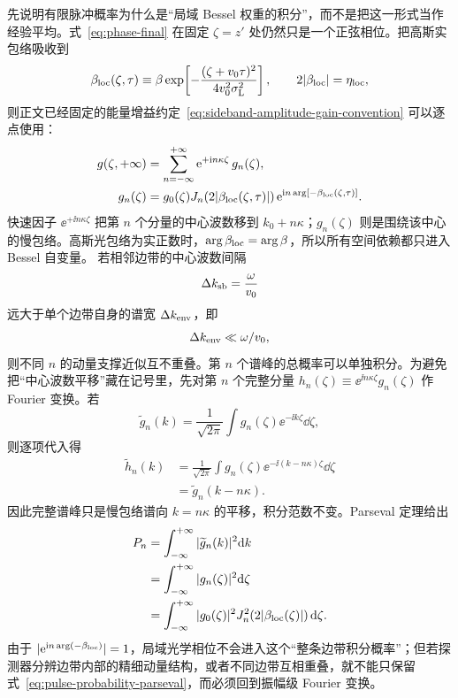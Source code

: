 先说明有限脉冲概率为什么是“局域 Bessel 权重的积分”，而不是把这一形式当作经验平均。式~\cref{eq:phase-final} 在固定 $\zeta=z'$ 处仍然只是一个正弦相位。把高斯实包络吸收到
\begin{equation}
\beta_{\rm loc}(\zeta,\tau)
\equiv
\beta\exp\!\left[-\frac{(\zeta+v_0\tau)^2}{4v_0^2\sigma_{\rm L}^2}\right],
\qquad
2|\beta_{\rm loc}|=\eta_{\rm loc},
\label{eq:beta-local-def}
\end{equation}
则正文已经固定的能量增益约定~\cref{eq:sideband-amplitude-gain-convention} 可以逐点使用：
\begin{align}
g(\zeta,+\infty)
&=\sum_{n=-\infty}^{+\infty}
\mathrm{e}^{+\mathrm{i} n\kappa\zeta}\,g_n(\zeta),
\label{eq:pulse-sideband-decomposition}\\
g_n(\zeta)
&=g_0(\zeta)
J_n\!\left(2|\beta_{\rm loc}(\zeta,\tau)|\right)
\mathrm{e}^{\mathrm{i} n\arg[-\beta_{\rm loc}(\zeta,\tau)]}.
\label{eq:pulse-local-sideband-amplitude}
\end{align}
快速因子 $\ee^{+\ii n\kappa\zeta}$ 把第 $n$ 个分量的中心波数移到
$k_0+n\kappa$；$g_n(\zeta)$ 则是围绕该中心的慢包络。高斯光包络为实正数时，$\arg\beta_{\rm loc}=\arg\beta$，所以所有空间依赖都只进入 Bessel 自变量。
若相邻边带的中心波数间隔
\begin{equation}
\Delta k_{\rm sb}=\frac{\omega}{v_0}
\end{equation}
远大于单个边带自身的谱宽 $\Delta k_{\rm env}$，即
\begin{equation}
{\Delta k_{\rm env}\ll \omega/v_0,}
\label{eq:sideband-orthogonality-general}
\end{equation}
则不同 $n$ 的动量支撑近似互不重叠。第 $n$ 个谱峰的总概率可以单独积分。为避免把“中心波数平移”藏在记号里，先对第 $n$ 个完整分量
$h_n(\zeta)\equiv\ee^{\ii n\kappa\zeta}g_n(\zeta)$ 作 Fourier 变换。若
\begin{equation}
\widetilde g_n(k)=\frac{1}{\sqrt{2\pi}}
\int g_n(\zeta)\ee^{-\ii k\zeta}\dd\zeta,
\end{equation}
则逐项代入得
\begin{align}
\widetilde h_n(k)
&=\frac{1}{\sqrt{2\pi}}
\int g_n(\zeta)\ee^{-\ii(k-n\kappa)\zeta}\dd\zeta\\
&=\widetilde g_n(k-n\kappa).
\label{eq:finite-pulse-fourier-shift}
\end{align}
因此完整谱峰只是慢包络谱向 $k=n\kappa$ 的平移，积分范数不变。Parseval 定理给出
\begin{align}
P_n
&=\int_{-\infty}^{+\infty}|\widetilde g_n(k)|^2\mathrm{d} k\\
&=\int_{-\infty}^{+\infty}|g_n(\zeta)|^2\mathrm{d}\zeta\\
&=\int_{-\infty}^{+\infty}|g_0(\zeta)|^2
J_n^2\!\left(2|\beta_{\rm loc}(\zeta)|\right)\mathrm{d}\zeta.
\label{eq:pulse-probability-parseval}
\end{align}
由于 $|\mathrm{e}^{\mathrm{i} n\arg(-\beta_{\rm loc})}|=1$，局域光学相位不会进入这个“整条边带积分概率”；但若探测器分辨边带内部的精细动量结构，或者不同边带互相重叠，就不能只保留式~\cref{eq:pulse-probability-parseval}，而必须回到振幅级 Fourier 变换。

